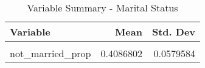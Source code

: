 \begin{table}[H]

\caption{\label{tab:tab:marital_status}Variable Summary - Marital Status}
\centering
\begin{tabular}[t]{lrr}
\toprule
Variable & Mean & Std. Dev\\
\midrule
\cellcolor{gray!6}{married\_prop} & \cellcolor{gray!6}{0.5913198} & \cellcolor{gray!6}{0.0579584}\\
not\_married\_prop & 0.4086802 & 0.0579584\\
\bottomrule
\end{tabular}
\end{table}
